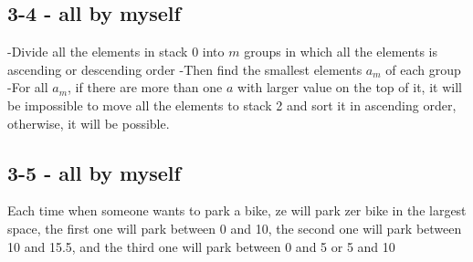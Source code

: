 \documentclass[12pt]{article}
\begin{document}
\subsection*{3-4 - all by myself}
-Divide all the elements in stack 0 into $m$ groups in which all the elements is ascending or descending order\newline
-Then find the smallest elements $a_m$ of each group \newline
-For all $a_m$, if there are more than one $a$ with larger value on the top of it, it will be impossible to move all the elements to stack 2 and sort it in ascending order, otherwise, it will be possible.

\subsection*{3-5 - all by myself}
Each time when someone wants to park a bike, ze will park zer bike in the largest space, the first one will park between 0 and 10, the second one will park between 10 and 15.5, and the third one will park between 0 and 5 or 5 and 10\newline
\end{document}
